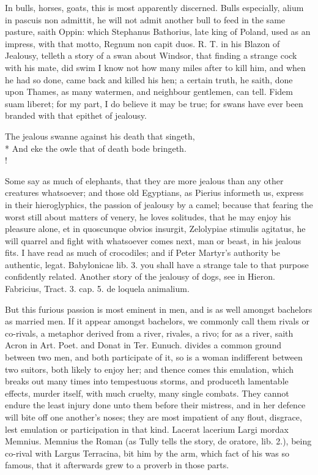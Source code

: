 In bulls, horses, goats, this is most apparently discerned. Bulls
especially, alium in pascuis non admittit, he will not admit another
bull to feed in the same pasture, saith Oppin: which Stephanus
Bathorius, late king of Poland, used as an impress, with that motto,
Regnum non capit duos. R. T. in his Blazon of Jealousy, telleth a story
of a swan about Windsor, that finding a strange cock with his mate, did
swim I know not how many miles after to kill him, and when he had so
done, came back and killed his hen; a certain truth, he saith, done
upon Thames, as many watermen, and neighbour gentlemen, can tell. Fidem
suam liberet; for my part, I do believe it may be true; for swans have
ever been branded with that epithet of jealousy.
%
{\gothfont%
\begin{versewithlinenos}{2}{1}{1}%
The jealous swanne against his death that singeth,\\*
And eke the owle that of death bode bringeth.\\!
\end{versewithlinenos}%
}%

Some say as much of elephants, that they are more jealous than
any other creatures whatsoever; and those old Egyptians, as
Pierius informeth us, express in their hieroglyphics, the passion
of jealousy by a camel; because that fearing the worst still
about matters of venery, he loves solitudes, that he may enjoy his
pleasure alone, et in quoscunque obvios insurgit, Zelolypiae stimulis
agitatus, he will quarrel and fight with whatsoever comes next, man or
beast, in his jealous fits. I have read as much of crocodiles;
and if Peter Martyr's authority be authentic, legat. Babylonicae lib.
3. you shall have a strange tale to that purpose confidently related.
Another story of the jealousy of dogs, see in Hieron. Fabricius, Tract.
3. cap. 5. de loquela animalium.

But this furious passion is most eminent in men, and is as well amongst
bachelors as married men. If it appear amongst bachelors, we commonly
call them rivals or co-rivals, a metaphor derived from a river,
rivales, a rivo; for as a river, saith Acron in \Horace{} Art. Poet.
and Donat in Ter. Eunuch. divides a common ground between two men, and
both participate of it, so is a woman indifferent between two suitors,
both likely to enjoy her; and thence comes this emulation, which breaks
out many times into tempestuous storms, and produceth lamentable
effects, murder itself, with much cruelty, many single combats. They
cannot endure the least injury done unto them before their mistress,
and in her defence will bite off one another's noses; they are most
impatient of any flout, disgrace, lest emulation or participation in
that kind. Lacerat lacerium Largi mordax Memnius. Memnius the
Roman (as Tully tells the story, de oratore, lib. 2.), being co-rival
with Largus Terracina, bit him by the arm, which fact of his was so
famous, that it afterwards grew to a proverb in those parts.

